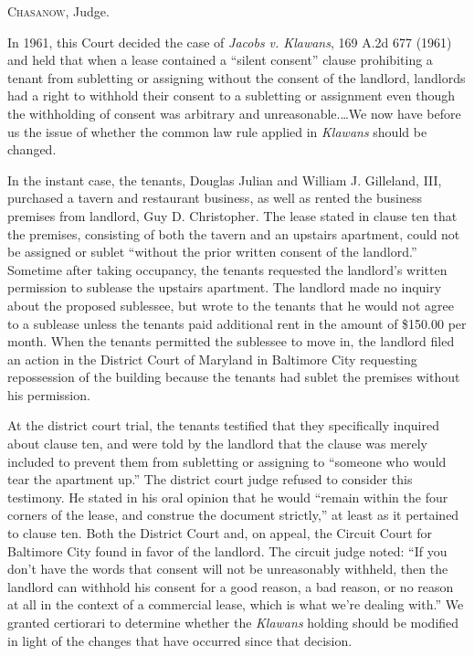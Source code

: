 

\opinion \textsc{Chasanow}, Judge.

In 1961, this Court decided the case of \textit{Jacobs v. Klawans}, 169 A.2d 677
(1961) and held that when a lease contained a ``silent consent'' clause
prohibiting a tenant from subletting or assigning without the consent of the
landlord, landlords had a right to withhold their consent to a subletting or
assignment even though the withholding of consent was arbitrary and
unreasonable.\ldots We now have before us the issue of whether the common law
rule applied in \textit{Klawans} should be changed.

In the instant case, the tenants, Douglas Julian and William J. Gilleland, III,
purchased a tavern and restaurant business, as well as rented the business
premises from landlord, Guy D. Christopher. The lease stated in clause ten that
the premises, consisting of both the tavern and an upstairs apartment, could
not be assigned or sublet ``without the prior written consent of the
landlord.'' Sometime after taking occupancy, the tenants requested the
landlord's written permission to sublease the upstairs apartment. The landlord
made no inquiry about the proposed sublessee, but wrote to the tenants that he
would not agree to a sublease unless the tenants paid additional rent in the
amount of \$150.00 per month. When the tenants permitted the sublessee to move
in, the landlord filed an action in the District Court of Maryland in Baltimore
City requesting repossession of the building because the tenants had sublet the
premises without his permission.  

At the district court trial, the tenants testified that they specifically
inquired about clause ten, and were told by the landlord that the clause was
merely included to prevent them from subletting or assigning to ``someone who
would tear the apartment up.'' The district court judge refused to consider
this testimony. He stated in his oral opinion that he would ``remain within the
four corners of the lease, and construe the document strictly,'' at least as it
pertained to clause ten. Both the District Court and, on appeal, the Circuit
Court for Baltimore City found in favor of the landlord. The circuit judge
noted: ``If you don't have the words that consent will not be unreasonably
withheld, then the landlord can withhold his consent for a good reason, a bad
reason, or no reason at all in the context of a commercial lease, which is what
we're dealing with.'' We granted certiorari to determine whether the
\textit{Klawans} holding should be modified in light of the changes that have
occurred since that decision.

